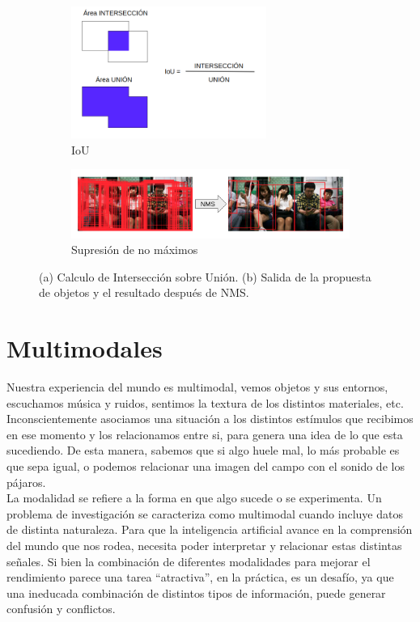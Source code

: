 \begin{figure}[]
	\begin{subfigure}{.5\textwidth}
		\centering
		\includegraphics[width=0.7\textwidth]{img/iou.png}
		\caption{IoU}
		\label{fig:IoU}
	\end{subfigure}
	\begin{subfigure}{.5\textwidth}
		\centering
		\includegraphics[width=1.1\textwidth]{img/NMS.png}
		\caption{Supresión de no máximos}
		\label{fig:NMS}
	\end{subfigure}
	\caption{(a) Calculo de Intersección sobre Unión. (b) Salida de la propuesta de objetos y el resultado después de NMS.}
		\label{fig:RP}
\end{figure}

\section{Multimodales} \label{sec:multimodales}

Nuestra experiencia del mundo es multimodal, vemos objetos y sus entornos, escuchamos música y ruidos, sentimos la textura de los distintos materiales, etc.  Inconscientemente asociamos una situación a los distintos estímulos que recibimos en ese momento y los relacionamos entre si, para genera una idea de lo que esta sucediendo. De esta manera, sabemos que si algo huele mal, lo más probable es que sepa igual, o podemos relacionar una imagen del campo con el sonido de los pájaros.\\

La modalidad se refiere a la forma en que algo sucede o se experimenta. Un problema de investigación se caracteriza como multimodal cuando incluye datos de distinta naturaleza. Para que la inteligencia artificial avance en la comprensión del mundo que nos rodea, necesita poder interpretar y relacionar estas distintas señales. Si bien la combinación de diferentes modalidades para mejorar el rendimiento parece una tarea ``atractiva'', en la práctica, es un desafío, ya que una ineducada combinación de distintos tipos de información, puede generar confusión y conflictos. 

